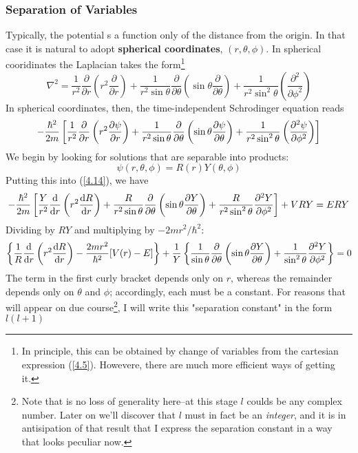 \subsubsection{Separation of Variables}
Typically, the potential s a function only of the distance from the origin. In that case it is natural to adopt \textbf{spherical coordinates}, $(r,\theta,\phi)$. In spherical cooridinates the Laplacian takes the form\footnote{In principle, this can be obtained by change of variables from the cartesian expression (\ref{4.5}). Howevere, there are much more efficient ways of getting it.}
\begin{equation}\label{4.13}
	\nabla^2=\frac{1}{r^2}\frac{\partial}{\partial r}\left(r^2\frac{\partial}{\partial r}\right)+\frac{1}{r^2\sin\theta}\frac{\partial}{\partial \theta}\left(\sin\theta\frac{\partial}{\partial \theta}\right)+\frac{1}{r^2\sin^2\theta}\left(\frac{\partial^2}{\partial\phi^2}\right)
\end{equation}
In spherical coordinates, then, the time-independent Schrodinger equation reads
\begin{equation}\label{4.14}
	-\frac{\hbar^2}{2m}\left[\frac{1}{r^2}\frac{\partial}{\partial r}\left(r^2\pdv{\psi}{r}\right)+\frac{1}{r^2\sin\theta}\frac{\partial}{\partial\theta}\left(\sin\theta\pdv{\psi}{\theta}\right)+\frac{1}{r^2\sin^2\theta}\left(\pdv[2]{\psi}{\phi}\right)\right]
\end{equation}
We begin by looking for solutions that are separable into products:
\begin{equation}\label{4.15}
	\psi(r,\theta,\phi)=R(r)Y(\theta,\phi)
\end{equation}
Putting this into (\ref{4.14}), we have $$-\frac{\hbar^2}{2m}\left[\frac{Y}{r^2}\frac{\dd}{\dd r}\left(r^2\dv{R}{r}\right)+\frac{R}{r^2\sin\theta}\frac{\partial}{\partial\theta}\left(\sin\theta\pdv{Y}{\theta}\right)+\frac{R}{r^2\sin^2\theta}\pdv[2]{Y}{\phi}\right]+VRY=ERY$$ Dividing by $RY$ and multiplying by $-2mr^2/\hbar^2$:
\begin{equation*}
	\left\{\frac{1}{R}\frac{\dd}{\dd r}\left(r^2\dv{R}{r}\right)-\frac{2mr^2}{\hbar^2}[V(r)-E]\right\}+\frac{1}{Y}\left\{\frac{1}{\sin\theta}\frac{\partial}{\partial\theta}\left(\sin\theta\pdv{Y}{\theta}\right)+\frac{1}{\sin^2\theta}\pdv[2]{Y}{\phi}\right\}=0
\end{equation*}
The term in the first curly bracket depends only on $r$, whereas the remainder depends only on $\theta$ and $\phi$; accordingly, each must be a constant. For reasons that will appear on due course\footnote{Note that is no loss of generality here--at this stage $l$ coulds be any complex number. Later on we'll discover that $l$ must in fact be an \textit{integer}, and it is in antisipation of that result that I express the separation constant in a way that looks peculiar now.}, I will write this "separation constant" in the form $l(l+1)$



